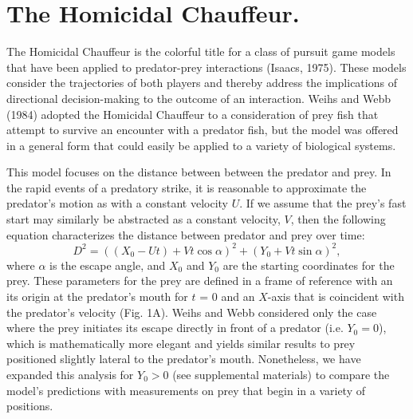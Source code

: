 \documentclass[12pt]{article}
\begin{document}
\section{The Homicidal Chauffeur.}

The Homicidal Chauffeur is the colorful title for a class of pursuit game models that have been applied to predator-prey interactions (Isaacs, 1975). These models consider the trajectories of both players and thereby address the implications of directional decision-making to the outcome of an interaction. Weihs and Webb (1984) adopted the Homicidal Chauffeur to a consideration of prey fish that attempt to survive an encounter with a predator fish, but the model was offered in a general form that could easily be applied to a variety of biological systems. 

This model focuses on the distance between between the predator and prey. In the rapid events of a predatory strike, it is reasonable to approximate the predator's motion as with a constant velocity $U$. If we assume that the prey's fast start may similarly be abstracted as a constant velocity, $V$, then the following equation characterizes the distance between predator and prey over time:
%
\begin{equation}
D^2 = ((X_0 - Ut) + Vt\cos\alpha)^2 + (Y_0  + Vt\sin\alpha)^2,
\label{dist}
\end{equation}
%
where $\alpha$ is the escape angle, and $X_0$ and  $Y_0$ are the starting coordinates for the prey. These parameters for the prey are defined in a frame of reference with an its origin at the predator's mouth for $t$ = 0 and an $X$-axis that is coincident with the predator's velocity (Fig. 1A). Weihs and Webb considered only the case where the prey initiates its escape directly in front of a predator (i.e. $Y_0=0$), which is mathematically more elegant and yields similar results to prey positioned slightly lateral to the predator's mouth. Nonetheless, we have expanded this analysis for $Y_0>0$ (see supplemental materials) to compare the model's predictions with measurements on prey that begin in a variety of positions.
\end{document}
